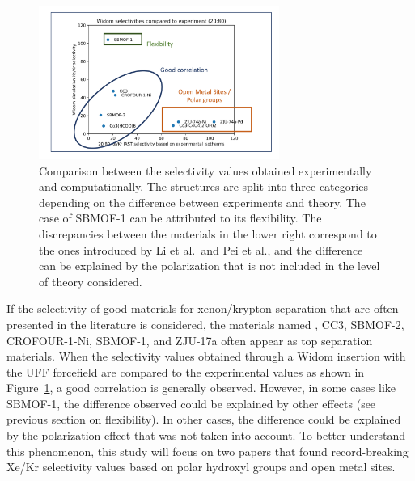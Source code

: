 \documentclass[main]{subfiles}
\begin{document}
\begin{figure}[ht]
  \centering
  \includegraphics[width=0.7\textwidth]{figures/6-perspectives/exp_theory_discrepancies.pdf}
  \caption{ Comparison between the selectivity values obtained experimentally and computationally. The structures are split into three categories depending on the difference between experiments and theory. The case of SBMOF-1 can be attributed to its flexibility. The discrepancies between the materials in the lower right correspond to the ones introduced by Li et al.\ and Pei et al.,\autocite{Li_2019,Pei_2022} and the difference can be explained by the polarization that is not included in the level of theory considered. }\label{fgr:exp_theory_discrepancy}
\end{figure}

If the selectivity of good materials for xenon/krypton separation that are often presented in the literature is considered, the materials named ,\autocite{Wang_2014} CC3,\autocite{Chen_2014} SBMOF-2,\autocite{Chen_2015} CROFOUR-1-Ni,\autocite{Mohamed_2016}  SBMOF-1,\autocite{Banerjee_2016} \autocite{Li_2019} and ZJU-17a\autocite{Pei_2022} often appear as top separation materials. When the selectivity values obtained through a Widom insertion with the UFF forcefield are compared to the experimental values as shown in Figure~\ref{fgr:exp_theory_discrepancy}, a good correlation is generally observed. However, in some cases like SBMOF-1, the difference observed could be explained by other effects (see previous section on flexibility). In other cases, the difference could be explained by the polarization effect that was not taken into account. To better understand this phenomenon, this study will focus on two papers that found record-breaking Xe/Kr selectivity values based on polar hydroxyl groups and open metal sites.
\end{document}
